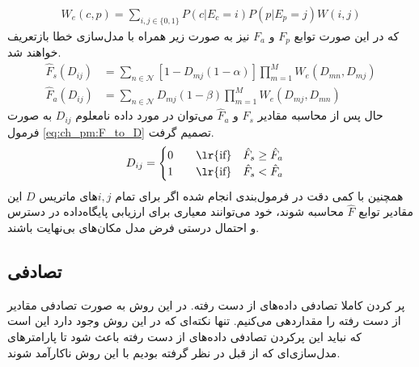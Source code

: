 \begin{equation}
	\begin{aligned}
		W_e(c,p) = \sum_{i,j \in \{0,1\}} P(c|E_c=i)P(p|E_p=j)W(i,j)
	\end{aligned}
	\label{eq:ch_pm:W_e}
\end{equation}
که در این صورت توابع $F_p$ و $F_a$ نیز به صورت زیر همراه با مدل‌سازی خطا بازتعریف خواهند شد.
\begin{equation}
	\begin{aligned}
		\hat{F}_s(D_{ij}) &= \sum_{n \in \mathcal{N}}  [1-D_{mj}(1-\alpha)]  \prod_{m=1}^{M} W_e(D_{mn}, D_{mj}) \\
		\hat{F}_a(D_{ij}) &= \sum_{n \in \mathcal{N}}  D_{mj}(1-\beta)  \prod_{m=1}^{M} W_e(D_{mj}, D_{mn})
	\end{aligned}
	\label{eq:ch_pm:F_all_final}
\end{equation}
حال پس از محاسبه مقادیر $\hat{F}_s$ و $\hat{F}_a$ می‌توان در مورد داده نامعلوم $D_{ij}$  به صورت فرمول \ref{eq:ch_pm:F_to_D} تصمیم گرفت.
\begin{equation}
	D_{ij} = \begin{cases}
		0 \qquad \text{\lr{if}} \quad \hat{F}_s \ge \hat{F}_a \\
		1 \qquad \text{\lr{if}} \quad \hat{F}_s < \hat{F}_a
	\end{cases}
	\label{eq:ch_pm:F_to_D}
\end{equation}
همچنین با کمی دقت در فرمول‌بندی انجام شده اگر برای تمام $i,j$های ماتریس $D$ این مقادیر توابع $\hat{F}$ محاسبه شوند، خود می‌توانند معیاری برای ارزیابی پایگاه‌داده در دسترس و احتمال درستی فرض مدل مکان‌های بی‌نهایت باشند.



\subsection{تصادفی}
پر کردن کاملا تصادفی داده‌های از دست رفته. در این روش به صورت تصادفی مقادیر از دست رفته را مقداردهی می‌کنیم. تنها نکته‌ای که در این روش وجود دارد این است که نباید این پرکردن تصادفی داده‌های از دست رفته باعث شود تا پارامترهای مدل‌سازی‌ای که از قبل در نظر گرفته بودیم با این روش ناکارآمد شوند.


